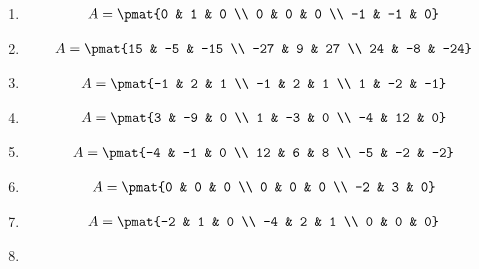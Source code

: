 \begin{enumerate}
\item

\begin{align*}
A = \pmat{0 & 1 & 0 \\ 0 & 0 & 0 \\ -1 & -1 & 0}
\end{align*}

\item

\begin{align*}
A = \pmat{15 & -5 & -15 \\ -27 & 9 & 27 \\ 24 & -8 & -24}
\end{align*}

\item

\begin{align*}
A = \pmat{-1 & 2 & 1 \\ -1 & 2 & 1 \\ 1 & -2 & -1}
\end{align*}

\item

\begin{align*}
A = \pmat{3 & -9 & 0 \\ 1 & -3 & 0 \\ -4 & 12 & 0}
\end{align*}

\item

\begin{align*}
A = \pmat{-4 & -1 & 0 \\ 12 & 6 & 8 \\ -5 & -2 & -2}
\end{align*}

\item

\begin{align*}
A = \pmat{0 & 0 & 0 \\ 0 & 0 & 0 \\ -2 & 3 & 0}
\end{align*}

\item

\begin{align*}
A = \pmat{-2 & 1 & 0 \\ -4 & 2 & 1 \\ 0 & 0 & 0}
\end{align*}

\item


\end{enumerate}
